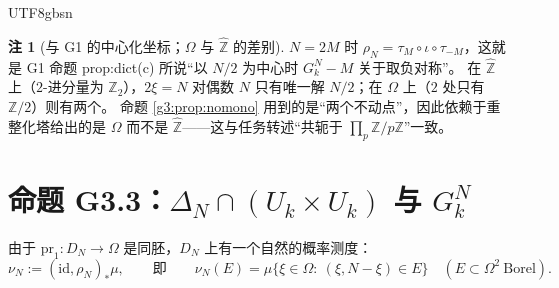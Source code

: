 \documentclass[11pt,a4paper]{article}
\newcommand{\Zhat}{\widehat{\mathbb Z}}
\newcommand{\Haar}{\mu}
\newcommand{\Om}{\Omega}               %
\newcommand{\pr}{\mathrm{pr}}
\theoremstyle{plain}
\theoremstyle{definition}
\newtheorem{rem}[lem]{注}
\begin{document}
\begin{CJK}{UTF8}{gbsn}
\begin{rem}[与 G1 的中心化坐标；$\Om$ 与 $\Zhat$ 的差别]\label{g3:rem:center}
$N=2M$ 时 $\rho_N=\tau_M\circ\iota\circ\tau_{-M}$，这就是 G1 命题 prop:dict(c) 所说“以 $N/2$ 为中心时 $G_k^N-M$ 关于取负对称”。
在 $\Zhat$ 上（$2$-进分量为 $\mathbb Z_2$），$2\xi=N$ 对偶数 $N$ 只有唯一解 $N/2$；在 $\Om$ 上（$2$ 处只有 $\mathbb Z/2$）则有两个。
命题 \ref{g3:prop:nomono} 用到的是“两个不动点”，因此依赖于重整化塔给出的是 $\Om$ 而不是 $\Zhat$——这与任务转述“共轭于 $\prod_p\mathbb Z/p\mathbb Z$”一致。
\end{rem}

\section{命题 G3.3：$\Delta_N\cap(U_k\times U_k)$ 与 $G_k^N$}\label{g3:sec:measure}

由于 $\pr_1:D_N\to\Om$ 是同胚，$D_N$ 上有一个自然的概率测度：
\[
\nu_N:=(\mathrm{id},\rho_N)_*\Haar,\qquad\text{即}\qquad \nu_N(E)=\Haar\{\xi\in\Om:\ (\xi,N-\xi)\in E\}\quad(E\subset\Om^2\ \text{Borel}).
\]


\end{CJK}
\end{document}
